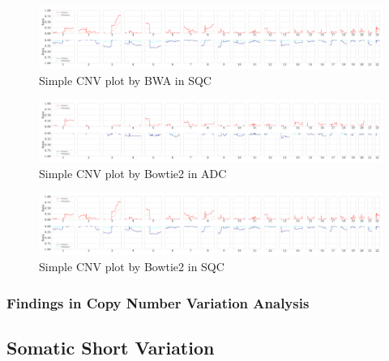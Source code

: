 \documentclass[11pt,a4paper,onecolumn,oneside]{report}
\begin{document}
                \begin{figure}[p]
                    \centering
                    \includegraphics[width=\linewidth]{figures/Sequenza/BWA-simple-SQC.pdf}
                    \caption{Simple CNV plot by BWA in SQC}
                    \label{fig:SimpleCNV-BWA-SQC}
                \end{figure}

                \begin{figure}[p]
                    \centering
                    \includegraphics[width=\linewidth]{figures/Sequenza/Bowtie2-simple-ADC.pdf}
                    \caption{Simple CNV plot by Bowtie2 in ADC}
                    \label{fig:SimpleCNV-Bowtie2-ADC}
                \end{figure}

                \begin{figure}[p]
                    \centering
                    \includegraphics[width=\linewidth]{figures/Sequenza/Bowtie2-simple-SQC.pdf}
                    \caption{Simple CNV plot by Bowtie2 in SQC}
                    \label{fig:SimpleCNV-Bowtie2-SQC}
                \end{figure}

            \subsubsection{Findings in Copy Number Variation Analysis}

        \subsection{Somatic Short Variation}
\end{document}
